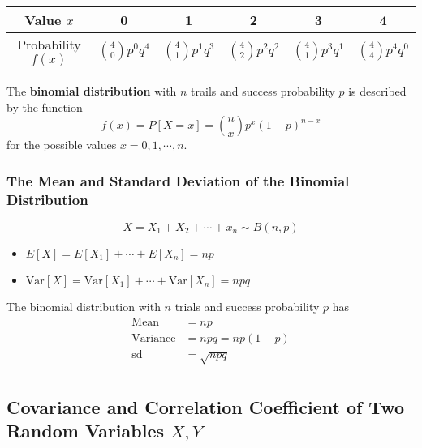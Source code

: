 \documentclass[12pt,openany]{book}
\theoremstyle{definition}
\newcommand{\Var}{\text{Var}}
\begin{document}
	\begin{center}\begin{tabular}{c||ccccc}
			\toprule[1.2pt]
			Value $x$ & 0 & 1 & 2 & 3 & 4 \\
			\hline
			Probability $f(x)$ & $\binom{4}{0}p^0q^4$ & $\binom{4}{1}p^1q^3$ & $\binom{4}{2}p^2q^2$ & $\binom{4}{1}p^3q^1$ & $\binom{4}{4}p^4q^0$ \\
			\bottomrule[1.2pt]
		\end{tabular}
	\end{center}
	
	\begin{tcolorbox}[colback=white]
		The \textbf{binomial distribution} with $n$ trails and success probability $p$ is described by the function \[
		f(x) = P[X=x] = \binom{n}{x}p^x(1-p)^{n-x}
		\] for the possible values $x = 0, 1, \cdots, n$.
	\end{tcolorbox}
	
	\subsubsection{The Mean and Standard Deviation of the Binomial Distribution}
	\[
	X=X_1+X_2+\cdots+x_n\sim B(n,p)
	\] \begin{itemize}
		\item \(E[X]=E[X_1] + \cdots + E[X_n] = np \)
		\item \(\Var[X]=\Var[X_1] + \cdots + \Var[X_n] = npq \)
	\end{itemize}
	
	\begin{tcolorbox}[colback=white]
		The binomial distribution with $n$ trials and success probability $p$ has \begin{align*}
		\text{Mean} &= np \\
		\text{Variance} &= npq = np(1-p) \\
		\text{sd} &= \sqrt{npq} \\
		\end{align*}
	\end{tcolorbox}
	
	\subsection{Covariance and Correlation Coefficient of Two Random Variables $X, Y$}
	
\end{document}
